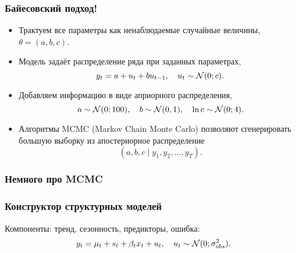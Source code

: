 \begin{frame}
  \frametitle{Байесовский подход!}

  \begin{itemize}[<+->]
    \item Трактуем все параметры как ненаблюдаемые \alert{случайные величины}, $\theta = (a, b, c)$.
    \item \alert{Модель} задаёт распределение ряда при заданных параметрах,
    \[
    y_t = a + u_t + b u_{t-1}, \quad u_t \sim \mathcal{N}(0; c).  
    \]
    \item Добавляем информацию в виде \alert{априорного распределения},
    \[
    a \sim \mathcal{N}(0;100), \quad b \sim \mathcal{N}(0, 1), \quad \ln c \sim \mathcal{N}(0;4).  
    \]
    \item Алгоритмы MCMC (Markov Chain Monte Carlo) позволяют 
    сгенерировать большую выборку из \alert{апостериорное распределение}
    \[
    (a, b, c \mid y_1, y_2, \ldots, y_T).
    \]
\end{itemize}

\end{frame}


\begin{frame}
  \frametitle{Немного про MCMC}
  
\begin{itemize}
  
\end{itemize}

\end{frame}

\begin{frame}
  \frametitle{Конструктор структурных моделей}

  Компоненты: \alert{тренд}, \alert{сезонность}, \alert{предикторы}, \alert{ошибка}:
  \[
  y_t = \mu_t + s_t + \beta_t x_t +  u_t, \quad u_t \sim \mathcal{N}(0; \sigma^2_{obs}).  
  \]


\end{frame}



